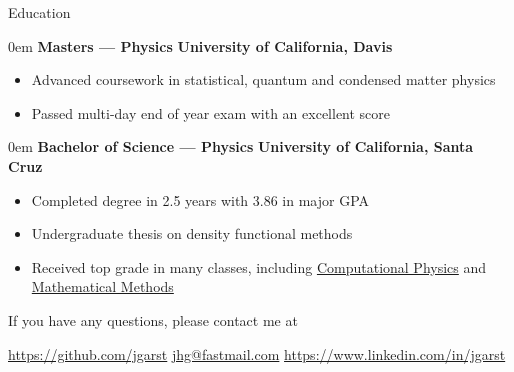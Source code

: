 \documentclass[11pt,a4paper]{article}
\newenvironment{headedsection}[2]{
    \begin{addmargin}[0.5em]{0em}
    {\large\bfseries #1} \hfill {\bfseries #2}%
    \begin{itemize}
        [label={}, topsep=0pt, itemsep=1.5pt, parsep=0pt, leftmargin=1.5em]
}{
    \end{itemize}
    \end{addmargin}
    \medskip
}
\begin{document}
\begin{mysection}{Education}
    \begin{headedsection}{Masters --- Physics}
          {University of California, Davis}

        \item Advanced coursework in statistical, quantum and condensed matter
            physics
        \item Passed multi-day end of year exam with an excellent score
    \end{headedsection}

    \begin{headedsection}{Bachelor of Science --- Physics}
          {University of California, Santa Cruz}

        \item Completed degree in 2.5 years with 3.86 in major GPA
        \item Undergraduate thesis on density functional methods
        \item Received top grade in many classes, including 
            \href{http://young.physics.ucsc.edu/115/}{Computational Physics}
            and
            \href{http://scipp.ucsc.edu/~haber/ph116C/}{Mathematical Methods}
    \end{headedsection}
\end{mysection}

\vfill

\begin{center}
    If you have any questions, please contact me at
\end{center}

\begin{center}
    \href{https://github.com/jgarst}{https://github.com/jgarst} 
    \textbullet{} 
    \href{jhg@fastmail.com}{jhg@fastmail.com}
    \textbullet{} 
    \href{https://www.linkedin.com/in/jgarst}
        {https://www.linkedin.com/in/jgarst}
\end{center}
\end{document}
